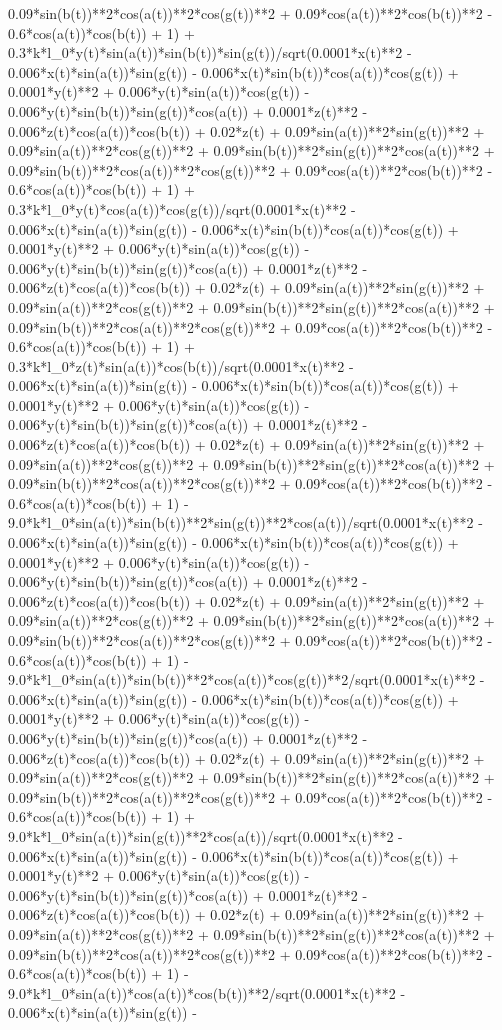 0.09*sin(b(t))**2*cos(a(t))**2*cos(g(t))**2 + 0.09*cos(a(t))**2*cos(b(t))**2 - 0.6*cos(a(t))*cos(b(t)) + 1) + 0.3*k*l_0*y(t)*sin(a(t))*sin(b(t))*sin(g(t))/sqrt(0.0001*x(t)**2 - 0.006*x(t)*sin(a(t))*sin(g(t)) - 0.006*x(t)*sin(b(t))*cos(a(t))*cos(g(t)) + 0.0001*y(t)**2 + 0.006*y(t)*sin(a(t))*cos(g(t)) - 0.006*y(t)*sin(b(t))*sin(g(t))*cos(a(t)) + 0.0001*z(t)**2 - 0.006*z(t)*cos(a(t))*cos(b(t)) + 0.02*z(t) + 0.09*sin(a(t))**2*sin(g(t))**2 + 0.09*sin(a(t))**2*cos(g(t))**2 + 0.09*sin(b(t))**2*sin(g(t))**2*cos(a(t))**2 + 0.09*sin(b(t))**2*cos(a(t))**2*cos(g(t))**2 + 0.09*cos(a(t))**2*cos(b(t))**2 - 0.6*cos(a(t))*cos(b(t)) + 1) + 0.3*k*l_0*y(t)*cos(a(t))*cos(g(t))/sqrt(0.0001*x(t)**2 - 0.006*x(t)*sin(a(t))*sin(g(t)) - 0.006*x(t)*sin(b(t))*cos(a(t))*cos(g(t)) + 0.0001*y(t)**2 + 0.006*y(t)*sin(a(t))*cos(g(t)) - 0.006*y(t)*sin(b(t))*sin(g(t))*cos(a(t)) + 0.0001*z(t)**2 - 0.006*z(t)*cos(a(t))*cos(b(t)) + 0.02*z(t) + 0.09*sin(a(t))**2*sin(g(t))**2 + 0.09*sin(a(t))**2*cos(g(t))**2 + 0.09*sin(b(t))**2*sin(g(t))**2*cos(a(t))**2 + 0.09*sin(b(t))**2*cos(a(t))**2*cos(g(t))**2 + 0.09*cos(a(t))**2*cos(b(t))**2 - 0.6*cos(a(t))*cos(b(t)) + 1) + 0.3*k*l_0*z(t)*sin(a(t))*cos(b(t))/sqrt(0.0001*x(t)**2 - 0.006*x(t)*sin(a(t))*sin(g(t)) - 0.006*x(t)*sin(b(t))*cos(a(t))*cos(g(t)) + 0.0001*y(t)**2 + 0.006*y(t)*sin(a(t))*cos(g(t)) - 0.006*y(t)*sin(b(t))*sin(g(t))*cos(a(t)) + 0.0001*z(t)**2 - 0.006*z(t)*cos(a(t))*cos(b(t)) + 0.02*z(t) + 0.09*sin(a(t))**2*sin(g(t))**2 + 0.09*sin(a(t))**2*cos(g(t))**2 + 0.09*sin(b(t))**2*sin(g(t))**2*cos(a(t))**2 + 0.09*sin(b(t))**2*cos(a(t))**2*cos(g(t))**2 + 0.09*cos(a(t))**2*cos(b(t))**2 - 0.6*cos(a(t))*cos(b(t)) + 1) - 9.0*k*l_0*sin(a(t))*sin(b(t))**2*sin(g(t))**2*cos(a(t))/sqrt(0.0001*x(t)**2 - 0.006*x(t)*sin(a(t))*sin(g(t)) - 0.006*x(t)*sin(b(t))*cos(a(t))*cos(g(t)) + 0.0001*y(t)**2 + 0.006*y(t)*sin(a(t))*cos(g(t)) - 0.006*y(t)*sin(b(t))*sin(g(t))*cos(a(t)) + 0.0001*z(t)**2 - 0.006*z(t)*cos(a(t))*cos(b(t)) + 0.02*z(t) + 0.09*sin(a(t))**2*sin(g(t))**2 + 0.09*sin(a(t))**2*cos(g(t))**2 + 0.09*sin(b(t))**2*sin(g(t))**2*cos(a(t))**2 + 0.09*sin(b(t))**2*cos(a(t))**2*cos(g(t))**2 + 0.09*cos(a(t))**2*cos(b(t))**2 - 0.6*cos(a(t))*cos(b(t)) + 1) - 9.0*k*l_0*sin(a(t))*sin(b(t))**2*cos(a(t))*cos(g(t))**2/sqrt(0.0001*x(t)**2 - 0.006*x(t)*sin(a(t))*sin(g(t)) - 0.006*x(t)*sin(b(t))*cos(a(t))*cos(g(t)) + 0.0001*y(t)**2 + 0.006*y(t)*sin(a(t))*cos(g(t)) - 0.006*y(t)*sin(b(t))*sin(g(t))*cos(a(t)) + 0.0001*z(t)**2 - 0.006*z(t)*cos(a(t))*cos(b(t)) + 0.02*z(t) + 0.09*sin(a(t))**2*sin(g(t))**2 + 0.09*sin(a(t))**2*cos(g(t))**2 + 0.09*sin(b(t))**2*sin(g(t))**2*cos(a(t))**2 + 0.09*sin(b(t))**2*cos(a(t))**2*cos(g(t))**2 + 0.09*cos(a(t))**2*cos(b(t))**2 - 0.6*cos(a(t))*cos(b(t)) + 1) + 9.0*k*l_0*sin(a(t))*sin(g(t))**2*cos(a(t))/sqrt(0.0001*x(t)**2 - 0.006*x(t)*sin(a(t))*sin(g(t)) - 0.006*x(t)*sin(b(t))*cos(a(t))*cos(g(t)) + 0.0001*y(t)**2 + 0.006*y(t)*sin(a(t))*cos(g(t)) - 0.006*y(t)*sin(b(t))*sin(g(t))*cos(a(t)) + 0.0001*z(t)**2 - 0.006*z(t)*cos(a(t))*cos(b(t)) + 0.02*z(t) + 0.09*sin(a(t))**2*sin(g(t))**2 + 0.09*sin(a(t))**2*cos(g(t))**2 + 0.09*sin(b(t))**2*sin(g(t))**2*cos(a(t))**2 + 0.09*sin(b(t))**2*cos(a(t))**2*cos(g(t))**2 + 0.09*cos(a(t))**2*cos(b(t))**2 - 0.6*cos(a(t))*cos(b(t)) + 1) - 9.0*k*l_0*sin(a(t))*cos(a(t))*cos(b(t))**2/sqrt(0.0001*x(t)**2 - 0.006*x(t)*sin(a(t))*sin(g(t)) - 